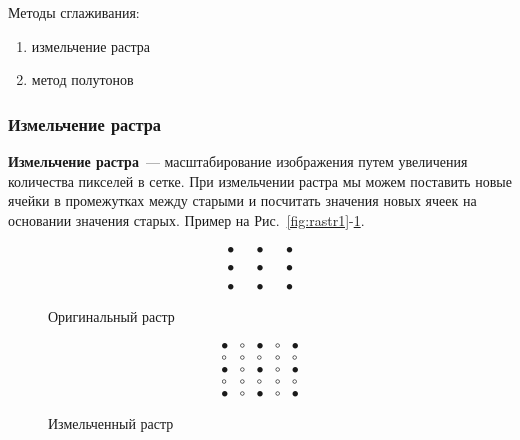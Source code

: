 Методы сглаживания:
\begin{enumerate}
    \item измельчение растра
    \item метод полутонов
\end{enumerate}

\subsubsection{Измельчение растра}

\textbf{Измельчение растра}~--- масштабирование изображения путем увеличения количества пикселей в сетке.
При измельчении растра мы можем поставить новые ячейки в промежутках между старыми и посчитать значения новых ячеек на основании значения старых. Пример на Рис.~\ref{fig:rastr1}-\ref{fig:rastr2}.

\begin{figure}[h!]
    \centering
    \begin{minipage}{0.3\textwidth}
        $$
            \begin{matrix}
                \bullet &  & \bullet &  & \bullet \\ \\ \bullet & & \bullet & & \bullet \\ \\ \bullet &  & \bullet & &  \bullet
            \end{matrix}
        $$
        \caption{Оригинальный растр}
        \label{fig:rastr1}
    \end{minipage} %
    \hspace{0.1\textwidth}
    \begin{minipage}{0.3\textwidth}
        $$
            \begin{matrix}
                \bullet & \circ & \bullet & \circ & \bullet \\
                \circ   & \circ & \circ   & \circ & \circ   \\
                \bullet & \circ & \bullet & \circ & \bullet \\
                \circ   & \circ & \circ   & \circ & \circ   \\
                \bullet & \circ & \bullet & \circ & \bullet
            \end{matrix}
        $$
        \caption{Измельченный растр}
        \label{fig:rastr2}
    \end{minipage}
\end{figure}

